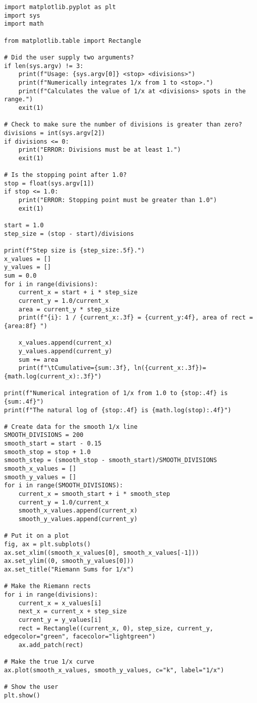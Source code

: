 \begin{Verbatim}
import matplotlib.pyplot as plt
import sys
import math

from matplotlib.table import Rectangle

# Did the user supply two arguments?
if len(sys.argv) != 3:
    print(f"Usage: {sys.argv[0]} <stop> <divisions>")
    print(f"Numerically integrates 1/x from 1 to <stop>.")
    print(f"Calculates the value of 1/x at <divisions> spots in the range.")
    exit(1)

# Check to make sure the number of divisions is greater than zero?
divisions = int(sys.argv[2])
if divisions <= 0:
    print("ERROR: Divisions must be at least 1.")
    exit(1)

# Is the stopping point after 1.0?
stop = float(sys.argv[1])
if stop <= 1.0:
    print("ERROR: Stopping point must be greater than 1.0")
    exit(1)

start = 1.0
step_size = (stop - start)/divisions

print(f"Step size is {step_size:.5f}.")
x_values = []
y_values = []
sum = 0.0
for i in range(divisions):
    current_x = start + i * step_size
    current_y = 1.0/current_x
    area = current_y * step_size
    print(f"{i}: 1 / {current_x:.3f} = {current_y:4f}, area of rect = {area:8f} ")

    x_values.append(current_x)
    y_values.append(current_y)
    sum += area
    print(f"\tCumulative={sum:.3f}, ln({current_x:.3f})={math.log(current_x):.3f}")

print(f"Numerical integration of 1/x from 1.0 to {stop:.4f} is {sum:.4f}")
print(f"The natural log of {stop:.4f} is {math.log(stop):.4f}")

# Create data for the smooth 1/x line
SMOOTH_DIVISIONS = 200
smooth_start = start - 0.15
smooth_stop = stop + 1.0
smooth_step = (smooth_stop - smooth_start)/SMOOTH_DIVISIONS
smooth_x_values = []
smooth_y_values = []
for i in range(SMOOTH_DIVISIONS):
    current_x = smooth_start + i * smooth_step
    current_y = 1.0/current_x
    smooth_x_values.append(current_x)
    smooth_y_values.append(current_y)

# Put it on a plot
fig, ax = plt.subplots()
ax.set_xlim((smooth_x_values[0], smooth_x_values[-1]))
ax.set_ylim((0, smooth_y_values[0]))
ax.set_title("Riemann Sums for 1/x")

# Make the Riemann rects
for i in range(divisions):
    current_x = x_values[i]
    next_x = current_x + step_size
    current_y = y_values[i]
    rect = Rectangle((current_x, 0), step_size, current_y, edgecolor="green", facecolor="lightgreen")
    ax.add_patch(rect)

# Make the true 1/x curve
ax.plot(smooth_x_values, smooth_y_values, c="k", label="1/x")

# Show the user
plt.show()

\end{Verbatim}

